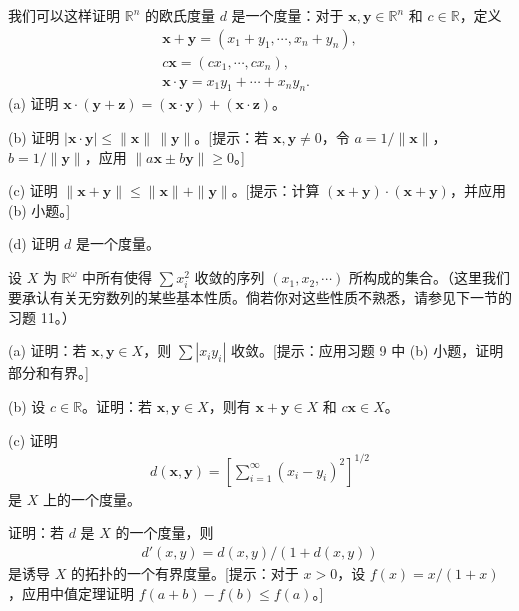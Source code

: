 \documentclass[../../main.tex]{subfiles}
\begin{document}
\begin{exercise}\label{exercise:ch02-度量拓扑-9}
我们可以这样证明 $\mathbb{R}^{n}$ 的欧氏度量 $d$ 是一个度量：对于 $\boldsymbol{x}, \boldsymbol{y} \in \mathbb{R}^{n}$ 和 $c \in \mathbb{R}$，定义
\begin{align*}
\boldsymbol{x} + \boldsymbol{y} = (x_{1} + y_{1}, \cdots, x_{n} + y_{n}), \\
c\boldsymbol{x} = (cx_{1}, \cdots, cx_{n}), \\
\boldsymbol{x} \cdot \boldsymbol{y} = x_{1}y_{1} + \cdots + x_{n}y_{n}.
\end{align*}
(a) 证明 $\boldsymbol{x} \cdot (\boldsymbol{y} + \boldsymbol{z}) = (\boldsymbol{x} \cdot \boldsymbol{y}) + (\boldsymbol{x} \cdot \boldsymbol{z})$。

(b) 证明 $|\boldsymbol{x} \cdot \boldsymbol{y}| \leqslant \|\boldsymbol{x}\|\, \|\boldsymbol{y}\|$。[提示：若 $\boldsymbol{x}, \boldsymbol{y} \neq 0$，令 $a = 1/\|\boldsymbol{x}\|$，$b = 1/\|\boldsymbol{y}\|$，应用 $\|a\boldsymbol{x} \pm b\boldsymbol{y}\| \geqslant 0$。]

(c) 证明 $\|\boldsymbol{x} + \boldsymbol{y}\| \leqslant \|\boldsymbol{x}\| + \|\boldsymbol{y}\|$。[提示：计算 $(\boldsymbol{x} + \boldsymbol{y}) \cdot (\boldsymbol{x} + \boldsymbol{y})$，并应用 (b) 小题。]

(d) 证明 $d$ 是一个度量。
\end{exercise}

\begin{exercise}\label{exercise:ch02-度量拓扑-10}
设 $X$ 为 $\mathbb{R}^{\omega}$ 中所有使得 $\sum x_{i}^{2}$ 收敛的序列 $(x_{1}, x_{2}, \cdots)$ 所构成的集合。（这里我们要承认有关无穷数列的某些基本性质。倘若你对这些性质不熟悉，请参见下一节的习题 11。）

(a) 证明：若 $\boldsymbol{x}, \boldsymbol{y} \in X$，则 $\sum |x_{i}y_{i}|$ 收敛。[提示：应用习题 9 中 (b) 小题，证明部分和有界。]

(b) 设 $c \in \mathbb{R}$。证明：若 $\boldsymbol{x}, \boldsymbol{y} \in X$，则有 $\boldsymbol{x} + \boldsymbol{y} \in X$ 和 $c\boldsymbol{x} \in X$。

(c) 证明
\begin{align*}
d(\boldsymbol{x}, \boldsymbol{y}) = \left[\sum_{i=1}^{\infty} (x_{i} - y_{i})^{2}\right]^{1/2}
\end{align*}
是 $X$ 上的一个度量。
\end{exercise}

\begin{exercise}\label{exercise:ch02-度量拓扑-11}
证明：若 $d$ 是 $X$ 的一个度量，则
\begin{align*}
d'(x, y) = d(x, y)/(1 + d(x, y))
\end{align*}
是诱导 $X$ 的拓扑的一个有界度量。[提示：对于 $x > 0$，设 $f(x) = x/(1 + x)$，应用中值定理证明 $f(a + b) - f(b) \leqslant f(a)$。]
\end{exercise}
\end{document}
